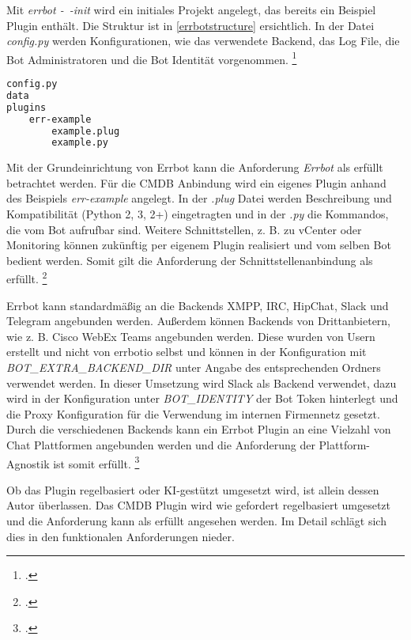 Mit \textit{errbot -~-init} wird ein initiales Projekt angelegt, das bereits ein Beispiel Plugin enthält. Die Struktur ist in \autoref{errbotstructure} ersichtlich. In der Datei \textit{config.py} werden Konfigurationen, wie das verwendete Backend, das Log File, die Bot Administratoren und die Bot Identität vorgenommen.
\footcite[Vgl.][o. \pno]{errbot_2018_setup}

\begin{lstlisting}[language=bash, label=errbotstructure, caption=Struktur eines Errbot Projektes]
config.py
data
plugins
    err-example
        example.plug
        example.py
\end{lstlisting}

Mit der Grundeinrichtung von Errbot kann die Anforderung \textit{Errbot} als erfüllt betrachtet werden. Für die \acs{CMDB} Anbindung wird ein eigenes Plugin anhand des Beispiels \textit{err-example} angelegt. In der \textit{.plug} Datei werden Beschreibung und Kompatibilität (Python 2, 3, 2+) eingetragten und in der \textit{.py} die Kommandos, die vom Bot aufrufbar sind. Weitere Schnittstellen, z. B. zu vCenter oder Monitoring können zukünftig per eigenem Plugin realisiert und vom selben Bot bedient werden. Somit gilt die Anforderung der Schnittstellenanbindung als erfüllt. 
\footcite[Vgl.][o. \pno]{errbot_2018_plugin}


Errbot kann standardmäßig an die Backends XMPP, IRC, HipChat, Slack und Telegram angebunden werden. Außerdem können Backends von Drittanbietern, wie z. B. Cisco WebEx Teams angebunden werden. Diese wurden von Usern erstellt und nicht von errbotio selbst und können in der Konfiguration mit \textit{BOT\_EXTRA\_BACKEND\_DIR} unter Angabe des entsprechenden Ordners verwendet werden. In dieser Umsetzung wird Slack als Backend verwendet, dazu wird in der Konfiguration unter \textit{BOT\_IDENTITY} der Bot Token hinterlegt und die Proxy Konfiguration für die Verwendung im internen Firmennetz gesetzt. Durch die verschiedenen Backends kann ein Errbot Plugin an eine Vielzahl von Chat Plattformen angebunden werden und die Anforderung der Plattform-Agnostik ist somit erfüllt.
\footcites[Vgl.][o. \pno]{errbot_2018_setup}[Vgl.][o. \pno]{errbot_2018_webex}

Ob das Plugin regelbasiert oder KI-gestützt umgesetzt wird, ist allein dessen Autor überlassen. Das \acs{CMDB} Plugin wird wie gefordert regelbasiert umgesetzt und die Anforderung kann als erfüllt angesehen werden. Im Detail schlägt sich dies in den funktionalen Anforderungen nieder.


